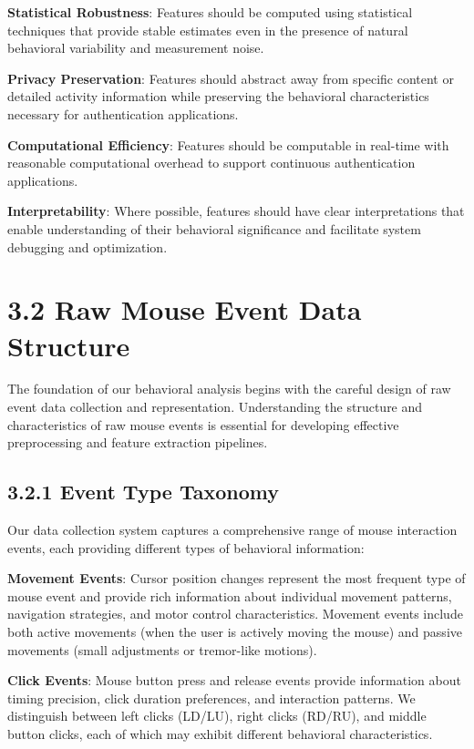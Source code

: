 \documentclass[
  12pt,
  a4paper,
]{report}
\begin{document}
\textbf{Statistical Robustness}: Features should be computed using
statistical techniques that provide stable estimates even in the
presence of natural behavioral variability and measurement noise.

\textbf{Privacy Preservation}: Features should abstract away from
specific content or detailed activity information while preserving the
behavioral characteristics necessary for authentication applications.

\textbf{Computational Efficiency}: Features should be computable in
real-time with reasonable computational overhead to support continuous
authentication applications.

\textbf{Interpretability}: Where possible, features should have clear
interpretations that enable understanding of their behavioral
significance and facilitate system debugging and optimization.

\section{3.2 Raw Mouse Event Data
Structure}\label{raw-mouse-event-data-structure}

The foundation of our behavioral analysis begins with the careful design
of raw event data collection and representation. Understanding the
structure and characteristics of raw mouse events is essential for
developing effective preprocessing and feature extraction pipelines.

\subsection{3.2.1 Event Type Taxonomy}\label{event-type-taxonomy}

Our data collection system captures a comprehensive range of mouse
interaction events, each providing different types of behavioral
information:

\textbf{Movement Events}: Cursor position changes represent the most
frequent type of mouse event and provide rich information about
individual movement patterns, navigation strategies, and motor control
characteristics. Movement events include both active movements (when the
user is actively moving the mouse) and passive movements (small
adjustments or tremor-like motions).

\textbf{Click Events}: Mouse button press and release events provide
information about timing precision, click duration preferences, and
interaction patterns. We distinguish between left clicks (LD/LU), right
clicks (RD/RU), and middle button clicks, each of which may exhibit
different behavioral characteristics.
\end{document}
